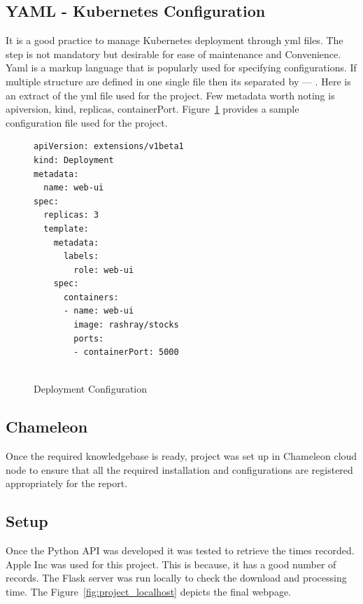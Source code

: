 \subsection{YAML - Kubernetes Configuration}
It is a good practice to manage Kubernetes deployment through yml files. The
step is not mandatory but desirable for ease of maintenance and Convenience.
Yaml is a markup language that is popularly used for specifying
configurations. If multiple structure are defined in one single file then its
separated by --- . Here is an extract of the yml file used for the project.
Few metadata worth noting is apiversion, kind, replicas, containerPort.
Figure~\ref{F:svc-setup} provides a sample configuration file used for the
project.

\begin{figure}
\begin{footnotesize}  
\begin{verbatim}
apiVersion: extensions/v1beta1
kind: Deployment
metadata:
  name: web-ui
spec:
  replicas: 3
  template:
    metadata:
      labels:
        role: web-ui
    spec:
      containers:
      - name: web-ui
        image: rashray/stocks
        ports:
        - containerPort: 5000
  
\end{verbatim}
\end{footnotesize}
\caption{Deployment Configuration}\label{F:svc-setup}
\end{figure}
\subsection{Chameleon}
Once the required knowledgebase is ready, project was set up in Chameleon
cloud node to ensure that all the required installation and configurations are
registered appropriately for the report.

\subsection{Setup}

Once the Python API was developed it was tested to retrieve the times
recorded. Apple Inc was used for this project. This is because, it has a good
number of records. The Flask server was run locally to check the download and
processing time. The Figure~\ref{fig:project_localhost} depicts the final
webpage.

